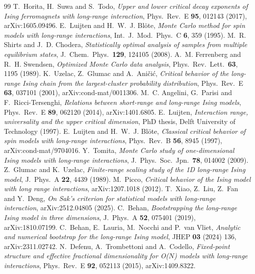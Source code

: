 \begin{thebibliography}{99}
 T.~Horita, H.~Suwa and S.~Todo, \emph{Upper and lower critical decay exponents of Ising ferromagnets with long-range interaction}, Phys.\ Rev.\ E \textbf{95}, 012143 (2017), arXiv:1605.09496.
 E.~Luijten and H.~W.~J. Bl\"ote, \emph{Monte Carlo method for spin models with long-range interactions}, Int.\ J.\ Mod.\ Phys.\ C \textbf{6}, 359 (1995).
 M.~R. Shirts and J.~D. Chodera, \emph{Statistically optimal analysis of samples from multiple equilibrium states}, J.\ Chem.\ Phys.\ \textbf{129}, 124105 (2008).
 A.~M. Ferrenberg and R.~H. Swendsen, \emph{Optimized Monte Carlo data analysis}, Phys.\ Rev.\ Lett.\ \textbf{63}, 1195 (1989).
 K.~Uzelac, Z.~Glumac and A.~Ani\v{c}i\'c, \emph{Critical behavior of the long-range Ising chain from the largest-cluster probability distribution}, Phys.\ Rev.\ E \textbf{63}, 037101 (2001), arXiv:cond-mat/0011306.
 M.~C. Angelini, G.~Parisi and F.~Ricci-Tersenghi, \emph{Relations between short-range and long-range Ising models}, Phys.\ Rev.\ E \textbf{89}, 062120 (2014), arXiv:1401.6805.
 E.~Luijten, \emph{Interaction range, universality and the upper critical dimension}, PhD thesis, Delft University of Technology (1997).
 E.~Luijten and H.~W.~J. Bl\"ote, \emph{Classical critical behavior of spin models with long-range interactions}, Phys.\ Rev.\ B \textbf{56}, 8945 (1997), arXiv:cond-mat/9704016.
 Y.~Tomita, \emph{Monte Carlo study of one-dimensional Ising models with long-range interactions}, J.\ Phys.\ Soc.\ Jpn.\ \textbf{78}, 014002 (2009).
 Z.~Glumac and K.~Uzelac, \emph{Finite-range scaling study of the 1D long-range Ising model}, J.\ Phys.\ A \textbf{22}, 4439 (1989).
 M.~Picco, \emph{Critical behavior of the Ising model with long range interactions}, arXiv:1207.1018 (2012).
 T.~Xiao, Z.~Liu, Z.~Fan and Y.~Deng, \emph{On Sak's criterion for statistical models with long-range interaction}, arXiv:2512.04805 (2025).
 C.~Behan, \emph{Bootstrapping the long-range Ising model in three dimensions}, J.\ Phys.\ A \textbf{52}, 075401 (2019), arXiv:1810.07199.
 C.~Behan, E.~Lauria, M.~Nocchi and P.~van Vliet, \emph{Analytic and numerical bootstrap for the long-range Ising model}, JHEP \textbf{03} (2024) 136, arXiv:2311.02742.
 N.~Defenu, A.~Trombettoni and A.~Codello, \emph{Fixed-point structure and effective fractional dimensionality for O($N$) models with long-range interactions}, Phys.\ Rev.\ E \textbf{92}, 052113 (2015), arXiv:1409.8322.
\end{thebibliography}
